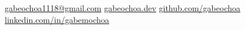 \documentclass[11pt]{article}
\begin{document}

\begin{center}
\nobreakvspace{0.3em}  %
\end{center}

\href{mailto:gabeochoa1118@gmail.com}{gabeochoa1118@gmail.com}\sbull
\href{https://gabeochoa.dev/}{gabeochoa.dev}\sbull
\href{https://github.com/gabeochoa}{github.com/gabeochoa}\sbull
\href{https://www.linkedin.com/in/gabemochoa}{linkedin.com/in/gabemochoa}



\spacedhrule{0.2em}{0.2em}  %
\end{document}

